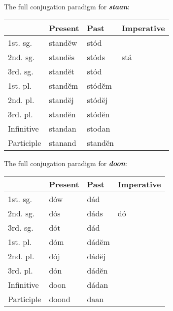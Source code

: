 The full conjugation paradigm for \textbf{\emph{staan}}:

\begin{center}
\begin{tabular}{llll}
& Present & Past & Imperative \\
\hline
1st. sg. & standĕw & stód   & \\
2nd. sg. & standĕs & stóds  & stá \\
3rd. sg. & standĕt & stód   & \\
1st. pl. & standĕm & stódĕm & \\
2nd. pl. & standĕj & stódĕj & \\
3rd. pl. & standĕn & stódĕn & \\
\hline
Infinitive & standan & stodan \\
Participle & stanand & standĕn \\
\end{tabular}
\end{center}

The full conjugation paradigm for \textbf{\emph{doon}}:

\begin{center}
\begin{tabular}{llll}
& Present & Past & Imperative \\
\hline
1st. sg. & dów & dád  & \\
2nd. sg. & dós & dáds & dó \\
3rd. sg. & dót & dád  & \\
1st. pl. & dóm & dádĕm & \\
2nd. pl. & dój & dádĕj & \\
3rd. pl. & dón & dádĕn & \\
\hline
Infinitive & doon & dádan \\
Participle & doond & daan  \\
\end{tabular}
\end{center}
